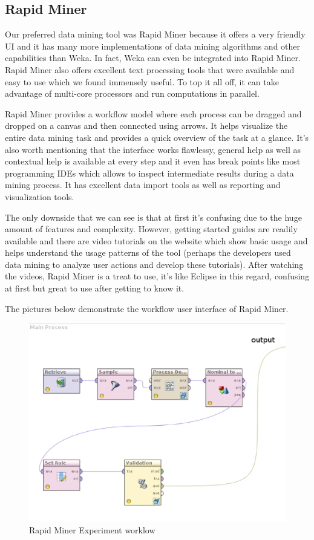 \subsection{Rapid Miner} %
\label{sub:Rapid Miner}
Our preferred data mining tool was Rapid Miner because it offers a very friendly UI and it has many more implementations of data mining algorithms and other capabilities than Weka. In fact, Weka can even be integrated into Rapid Miner. Rapid Miner also offers excellent text processing tools that were available and easy to use which we found immensely useful. To top it all off, it can take advantage of multi-core processors and run computations in parallel.

Rapid Miner provides a workflow model where each process can be dragged and dropped on a canvas and then connected using arrows. It helps visualize the entire data mining task and provides a quick overview of the task at a glance. It's also worth mentioning that the interface works flawlessy, general help as well as contextual help is available at every step and it even has break points like most programming IDEs which allows to inspect intermediate results during a data mining process. It has excellent data import tools as well as reporting and visualization tools.

The only downside that we can see is that at first it's confusing due to the huge amount of features and complexity. However, getting started guides are readily available and there are video tutorials on the website which show basic usage and helps understand the usage patterns of the tool (perhaps the developers used data mining to analyze user actions and develop these tutorials). After watching the videos, Rapid Miner is a treat to use, it's like Eclipse in this regard, confusing at first but great to use after getting to know it.

The pictures below demonstrate the workflow user interface of Rapid Miner.

\begin{figure}[!hbp]
\begin{center}
    \includegraphics[scale=0.5]{rapidMiner-process}
\caption{\label{pic:st_art}  Rapid Miner Experiment worklow}
\end{center}
\end{figure}


